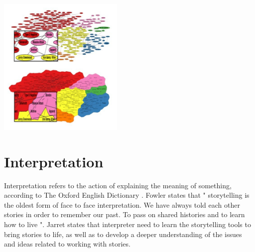 \documentclass{egpubl}
\begin{document}
\begingroup
\centering
\includegraphics[width=6cm]{./images/saket2015}
\label{fig:saket2015}
\endgroup




\section{Interpretation}
Interpretation refers to the action of explaining the meaning of something, according to The Oxford English Dictionary \cite{Interpretation}. Fowler \cite{fowler2003ancient} states that " storytelling is the oldest form of face to face interpretation. We have always told each other stories in order to remember our past. To pass on shared histories and to learn how to live ". Jarret \cite{jarret2006storytelling} states that interpreter need to learn the storytelling tools to bring stories to life, as well as to develop a deeper understanding of the issues and ideas related to working with stories. 
\end{document}
